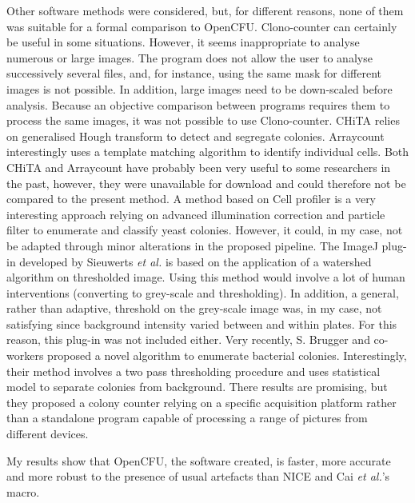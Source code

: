 \documentclass[10pt]{article}
\begin{document}
{
Other software methods were considered, but, for different reasons,
none of them was suitable for a formal comparison to OpenCFU. 
Clono-counter
{\cite{niyazi_counting_2007}}
can certainly be useful in some situations. However, it seems inappropriate to analyse numerous or large images.  
The program does not allow the user to analyse successively several files, and, for instance, using
the same mask for different images is not possible.
In addition, large images need to be down-scaled before analysis. 
Because an objective comparison between programs requires them to process the same images,
it was not possible to use Clono-counter.
CHiTA
{\cite{bewes_automated_2008}}
relies on generalised Hough transform to detect and segregate colonies.
Arraycount
{\cite{kachouie_arraycount_2009}}
interestingly uses a template matching algorithm to identify individual cells.
Both CHiTA and Arraycount have probably been very useful to some researchers in the past, however,
they were unavailable for download and could therefore not be compared to the present
method.
A method based on Cell profiler
{\cite {vokes_using_2008}} 
is a very interesting approach relying on advanced illumination 
correction and particle filter to enumerate and classify yeast colonies.
However, it could, in my case, not be adapted through minor
alterations in the proposed pipeline.
The ImageJ plug-in developed by Sieuwerts \emph{et al.}
{\cite{sieuwerts_simple_2008}}
is based on the application of a watershed algorithm on thresholded image.  
Using this method would involve a lot of human
interventions (converting to grey-scale and thresholding).
In addition, a general, rather than adaptive, threshold on the grey-scale image was, in my case, 
not satisfying since background intensity varied between and within plates.
For this reason, this plug-in was not included either.
Very recently, S. Brugger and co-workers
{ \cite{brugger_automated_2012}}
 proposed a novel algorithm to enumerate bacterial colonies.
 Interestingly, their
method involves a two pass thresholding procedure and uses statistical model
 to separate colonies from background. 
 There results are promising, but they proposed a colony counter relying on a specific
  acquisition platform rather than a standalone program capable of processing a range of 
  pictures from different devices.
}


My results show that OpenCFU, the software created, is faster, more accurate and
more robust to the presence of usual artefacts than NICE and Cai \emph{et al.}'s macro.
\end{document}
